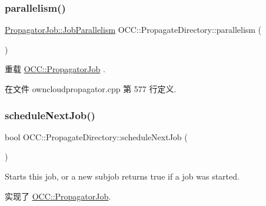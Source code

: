 \mbox{\label{class_o_c_c_1_1_propagate_directory_ad2a8216e88230c7257a5a09aa7e58647}} 
\subsubsection{\texorpdfstring{parallelism()}{parallelism()}}
{\footnotesize\ttfamily \hyperlink{class_o_c_c_1_1_propagator_job_a2527eb0e2b598fc260a2d6449689c156}{Propagator\+Job\+::\+Job\+Parallelism} O\+C\+C\+::\+Propagate\+Directory\+::parallelism (\begin{DoxyParamCaption}{ }\end{DoxyParamCaption})\hspace{0.3cm}{\ttfamily [virtual]}}



重载 \hyperlink{class_o_c_c_1_1_propagator_job_a55105e001d55177f8ccf01acecc5e637}{O\+C\+C\+::\+Propagator\+Job} .



在文件 owncloudpropagator.\+cpp 第 577 行定义.

\mbox{\label{class_o_c_c_1_1_propagate_directory_af5975e88fdfcbc25241a60c2fc2ef5ef}} 
\subsubsection{\texorpdfstring{schedule\+Next\+Job()}{scheduleNextJob()}}
{\footnotesize\ttfamily bool O\+C\+C\+::\+Propagate\+Directory\+::schedule\+Next\+Job (\begin{DoxyParamCaption}{ }\end{DoxyParamCaption})\hspace{0.3cm}{\ttfamily [virtual]}}

Starts this job, or a new subjob returns true if a job was started. 

实现了 \hyperlink{class_o_c_c_1_1_propagator_job_a344574482155de72f164883b56f4ebf3}{O\+C\+C\+::\+Propagator\+Job}.



